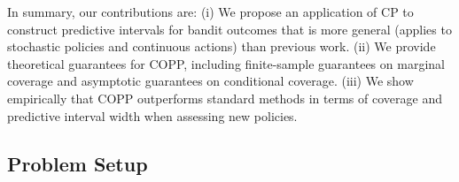 In summary, our contributions are: 
(i) We propose an application of CP to construct predictive intervals for bandit outcomes that is more general (applies to stochastic policies and continuous actions) than previous work.
(ii) We provide theoretical guarantees for COPP, including finite-sample guarantees on marginal coverage and asymptotic guarantees on conditional coverage.
(iii) We show empirically that COPP outperforms standard methods in terms of coverage and predictive interval width when assessing new policies. 

\subsection{Problem Setup}\label{sec:problem_setup}

